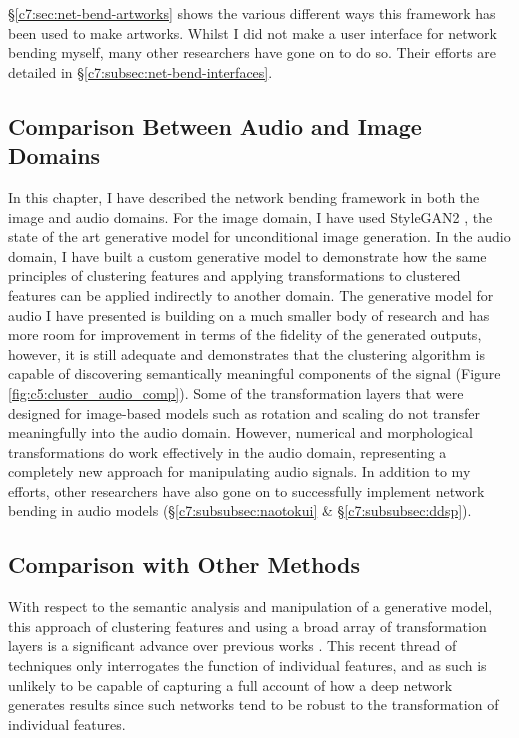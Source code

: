 \S \ref{c7:sec:net-bend-artworks} shows the various different ways this framework has been used to make artworks.
Whilst I did not make a user interface for network bending myself, many other researchers have gone on to do so.
Their efforts are detailed in \S \ref{c7:subsec:net-bend-interfaces}.

\subsection{Comparison Between Audio and Image Domains}

In this chapter, I have described the network bending framework in both the image and audio domains. 
For the image domain, I have used StyleGAN2 \citep{karras2019analyzing}, the state of the art generative model for unconditional image generation. In the audio domain, I have built a custom generative model to demonstrate how the same principles of clustering features and applying transformations to clustered features can be applied indirectly to another domain. 
The generative model for audio I have presented is building on a much smaller body of research and has more room for improvement in terms of the fidelity of the generated outputs, however, it is still adequate and demonstrates that the clustering algorithm is capable of discovering semantically meaningful components of the signal (Figure \ref{fig:c5:cluster_audio_comp}). 
Some of the transformation layers that were designed for image-based models such as rotation and scaling do not transfer meaningfully into the audio domain. 
However, numerical and morphological transformations do work effectively in the audio domain, representing a completely new approach for manipulating audio signals. 
In addition to my efforts, other researchers have also gone on to successfully implement network bending in audio models (\S \ref{c7:subsubsec:naotokui} \& \S \ref{c7:subsubsec:ddsp}).

\subsection{Comparison with Other Methods}

With respect to the semantic analysis and manipulation of a generative model, this approach of clustering features and using a broad array of transformation layers is a significant advance over previous works \citep{Bau2017-vg,Bau2018-td,bau2019semantic, Brink2019-gc}. 
This recent thread of techniques only interrogates the function of individual features, and as such is unlikely to be capable of capturing a full account of how a deep network generates results since such networks tend to be robust to the transformation of individual features. 

